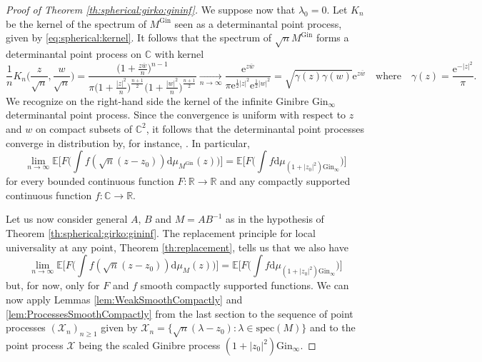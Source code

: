 \documentclass[10pt,reqno]{amsart}
\newcommand{\dd}{\mathrm{d}}
\newcommand{\<}{\langle}
\renewcommand{\>}{\rangle}
\newcommand{\G}{\mathrm{Gin}}
\newcommand{\MG}{M^{\mathrm{Gin}}}
\numberwithin{equation}{section}
\begin{document}
\begin{proof}[Proof of Theorem \ref{th:spherical:girko:gininf}]
We suppose now that $\lambda_0=0$.
Let $K_n$ be the kernel of the spectrum of $\MG$ seen as a determinantal point process, given by \eqref{eq:spherical:kernel}. It follows that the spectrum of $\sqrt{n}\MG$ forms a determinantal point process on $\mathbb{C}$ with kernel
\begin{equation}
    \frac{1}{n}K_n\Bigr(\frac{z}{\sqrt{n}},\frac{w}{\sqrt{n}}\Bigr)
    =\frac{\Bigr(1+\frac{z\overline{w}}{n}\Bigr)^{n-1}}{\pi\Bigr(1+\frac{|z|^2}{n}\Bigr)^{\frac{n+1}{2}}\Bigr(1+\frac{|w|^2}{n}\Bigr)^{\frac{n+1}{2}}}
    \xrightarrow[n\to\infty]{}
    \frac{\mathrm{e}^{z\overline{w}}}{\pi\mathrm{e}^{\frac{1}{2}|z|^2}\mathrm{e}^{\frac{1}{2}|w|^2}}
    =\sqrt{\gamma(z)\gamma(w)}\mathrm{e}^{z\overline{w}}
    \quad\text{where}\quad
    \gamma(z)=\frac{\mathrm{e}^{-|z|^2}}{\pi}.
\end{equation}
We recognize on the right-hand side the kernel of the infinite Ginibre $\mathrm{Gin}_\infty$ determinantal point process. Since the convergence is uniform with respect to $z$ and $w$ on compact subsets of $\mathbb{C}^2$, it follows that the determinantal point processes converge in distribution by, for instance, 
\cite[Proposition 3.10]{MR2018415}. 
In particular,
\[\lim_{n \to \infty} \mathbb{E}\Bigr[F\Bigr( \int f(\sqrt n (z-z_0))\dd\mu_{\MG}(z)\Bigr)\Bigr] =
\mathbb{E}\Bigr[F\Bigr(\int f \dd\mu_{(1+|z_0|^2)\mathrm{Gin_{\infty}}} \Bigr)\Bigr]\]
for every bounded continuous function $F: \mathbb R \to \mathbb R$ 
and any compactly supported continuous function
$f:\mathbb C \to \mathbb R$.


Let us now consider general $A$, $B$ and $M = AB^{-1}$ as in the hypothesis of
Theorem \ref{th:spherical:girko:gininf}.
The replacement principle for local universality at any point,
Theorem \ref{th:replacement}, tells us that we also have
\[\lim_{n \to \infty} \mathbb{E}\Bigr[F\Bigr(\int f(\sqrt n (z-z_0))\dd\mu_{M}(z)\Bigr)\Bigr] =
\mathbb{E}\Bigr[F\Bigr(\int f \dd\mu_{(1+|z_0|^2)\mathrm{Gin_{\infty}}}
\Bigr)\Bigr]\]
but, for now, only for $F$ and $f$ smooth compactly supported
functions. 
We can now apply Lemmas 
\ref{lem:WeakSmoothCompactly}
and
\ref{lem:ProcessesSmoothCompactly} from the last section to the
sequence of point processes
$(\mathcal X_n)_{n \geq 1}$ given by
$\mathcal X_n = \{\sqrt n(\lambda - z_0) : \lambda \in \mathrm{spec}(M)\}$
and to the point process
$\mathcal X$ being the scaled Ginibre process
$(1+|z_0|^2) \G_{\infty}$. 



\end{proof}
\end{document}

